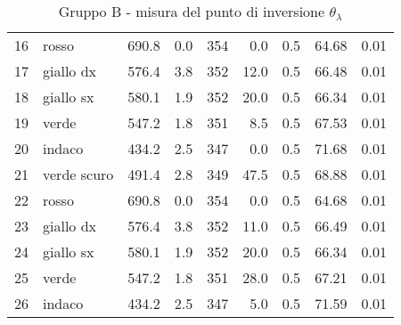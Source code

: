 \begin{table}[!htbp]
{\begin{tabular}{clcccrrcc}
            16  &   rosso        &   690.8  & 0.0 &  354 &   0.0   & 0.5 & 64.68 &   0.01\\
            17  &   giallo dx    &   576.4  & 3.8 &  352 &   12.0  & 0.5 & 66.48 &   0.01\\
            18  &   giallo sx    &   580.1  & 1.9 &  352 &   20.0  & 0.5 & 66.34 &   0.01\\
            19  &   verde        &   547.2  & 1.8 &  351 &   8.5   & 0.5 & 67.53 &   0.01\\
            20  &   indaco       &   434.2  & 2.5 &  347 &   0.0   & 0.5 & 71.68 &   0.01\\
            21  &   verde scuro  &   491.4  & 2.8 &  349 &   47.5  & 0.5 & 68.88 &   0.01\\
            22  &   rosso        &   690.8  & 0.0 &  354 &   0.0   & 0.5 & 64.68 &   0.01\\
            23  &   giallo dx    &   576.4  & 3.8 &  352 &   11.0  & 0.5 & 66.49 &   0.01\\
            24  &   giallo sx    &   580.1  & 1.9 &  352 &   20.0  & 0.5 & 66.34 &   0.01\\
            25  &   verde        &   547.2  & 1.8 &  351 &   28.0  & 0.5 & 67.21 &   0.01\\
            26  &   indaco       &   434.2  & 2.5 &  347 &   5.0   & 0.5 & 71.59 &   0.01\\
        \hline
    \end{tabular}
    \par}
    \caption{Gruppo B - misura del punto di inversione $\theta_{\lambda}$} \label{table:tbl10}
\end{table}


